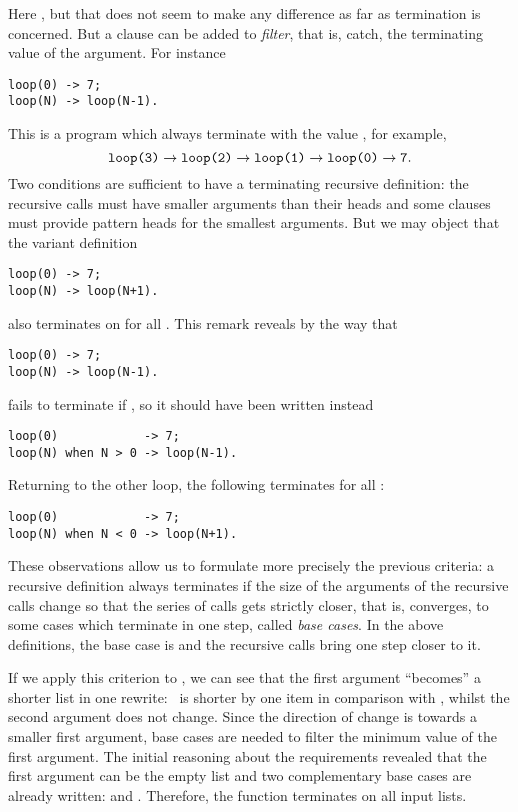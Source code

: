 Here , but that does not seem to make any
difference as far as termination is concerned. But a clause can be
added to \emph{filter}, that is, catch, the terminating value of the
argument. For instance
\begin{verbatim}
loop(0) -> 7;
loop(N) -> loop(N-1).
\end{verbatim}
This is a program which always terminate with the value ,
for example,
\[
\texttt{loop(3)} \rightarrow \texttt{loop(2)} \rightarrow
\texttt{loop(1)} \rightarrow \texttt{loop(0)} \rightarrow
\texttt{7}.
\]
Two conditions are sufficient to have a terminating recursive
definition: the recursive calls must have smaller arguments than their
heads and some clauses must provide pattern heads for the smallest
arguments. But we may object that the variant definition
\begin{verbatim}
loop(0) -> 7;
loop(N) -> loop(N+1).
\end{verbatim}
also terminates on  for all . This remark
reveals by the way that
\begin{verbatim}
loop(0) -> 7;
loop(N) -> loop(N-1).
\end{verbatim}
fails to terminate if , so it should have been written
instead
\begin{verbatim}
loop(0)            -> 7;
loop(N) when N > 0 -> loop(N-1).
\end{verbatim}
Returning to the other loop, the following terminates for all
:
\begin{verbatim}
loop(0)            -> 7;
loop(N) when N < 0 -> loop(N+1).
\end{verbatim}
These observations allow us to formulate more precisely the previous
criteria: a recursive definition always terminates if the size of the
arguments of the recursive calls change so that the series of calls
gets strictly closer, that is, converges, to some cases which
terminate in one step, called \emph{base cases}. In the above
definitions, the base case is  and the recursive
calls bring one step closer to it.

If we apply this criterion to , we can see that the
first argument ``becomes'' a shorter list in one rewrite:
~is shorter by one item in comparison with \erlcode{[I|P]},
whilst the second argument does not change. Since the direction of
change is towards a smaller first argument, base cases are needed to
filter the minimum value of the first argument. The initial reasoning
about the requirements revealed that the first argument can be the
empty list and two complementary base cases are already written:
 and . Therefore, the
function  terminates on all input lists.


